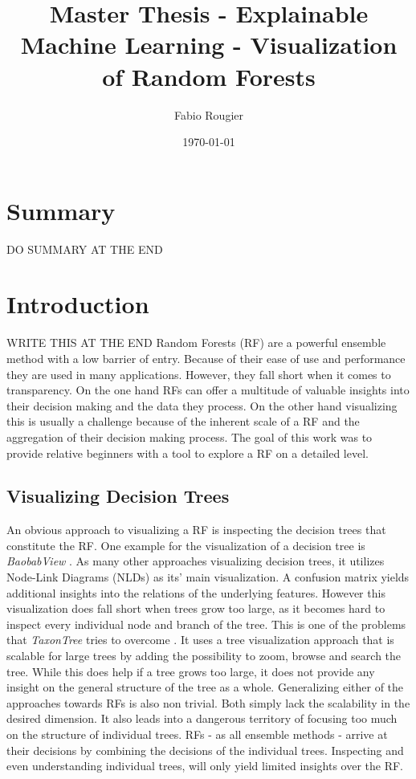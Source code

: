 \documentclass[a4paper, 12pt]{article}
\title{Master Thesis - Explainable Machine Learning - Visualization of Random Forests}
\author{Fabio Rougier}
\date{\today}
\begin{document}
\maketitle

\clearpage
\section{Summary}
DO SUMMARY AT THE END

\tableofcontents
\clearpage

\section{Introduction}
WRITE THIS AT THE END
Random Forests (RF) \cite{breiman2001random} are a powerful ensemble method with a low barrier of entry. Because of their
ease of use and performance they are used in many applications. However, they fall short
when it comes to transparency.
On the one hand RFs can offer a multitude of valuable insights into their decision making and the data they
process. On the other hand visualizing this is usually a challenge because of the inherent scale of a RF and the
aggregation of their decision making process. The goal of this work was to provide relative
beginners with a tool to explore a RF on a detailed level.

\subsection{Visualizing Decision Trees}
An obvious approach to visualizing a RF is inspecting the decision trees that constitute
the RF. One example for the visualization of a decision tree is \textit{BaobabView}
\cite{van2011baobabview}. As many other approaches visualizing decision trees, it utilizes
Node-Link Diagrams (NLDs) as its' main visualization. A confusion matrix yields additional
insights into the relations of the underlying features.
However this visualization does fall short when trees grow too large, as it becomes hard to
inspect every individual node and branch of the tree.
This is one of the problems that \textit{TaxonTree} tries to overcome
\cite{parr2003taxontree}. It uses a tree visualization approach that is scalable for large
trees by adding the possibility to zoom, browse and search the tree. While this does
help if a tree grows too large, it does not provide any insight on the general structure of
the tree as a whole.
\linebreak
Generalizing either of the approaches towards RFs is also non trivial. Both simply lack the
scalability in the desired dimension. It also leads into a dangerous territory of focusing too much on
the structure of individual trees. RFs - as all ensemble methods - arrive at their decisions
by combining the decisions of the individual trees. Inspecting and even understanding
individual trees, will only yield limited insights over the RF.
\end{document}
